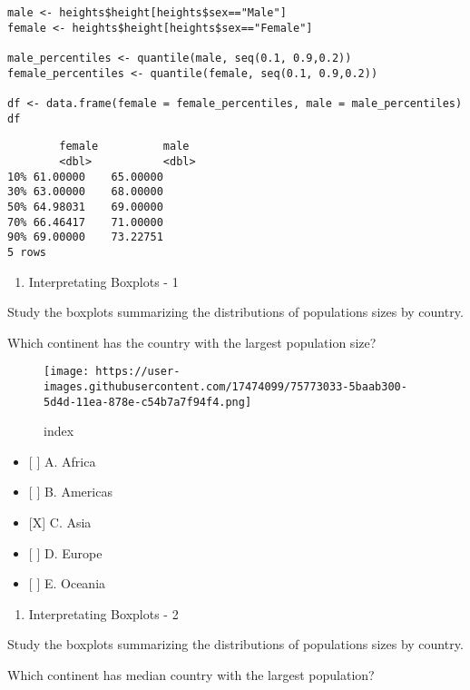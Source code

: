 \documentclass[]{article}
\providecommand{\tightlist}{%
  \setlength{\itemsep}{0pt}\setlength{\parskip}{0pt}}
\begin{document}
\begin{verbatim}
male <- heights$height[heights$sex=="Male"]
female <- heights$height[heights$sex=="Female"]

male_percentiles <- quantile(male, seq(0.1, 0.9,0.2))
female_percentiles <- quantile(female, seq(0.1, 0.9,0.2))

df <- data.frame(female = female_percentiles, male = male_percentiles)
df
\end{verbatim}

\begin{verbatim}
        female          male
        <dbl>           <dbl>
10% 61.00000    65.00000
30% 63.00000    68.00000
50% 64.98031    69.00000
70% 66.46417    71.00000
90% 69.00000    73.22751
5 rows
\end{verbatim}

\begin{enumerate}
\def\labelenumi{\arabic{enumi}.}
\setcounter{enumi}{2}
\tightlist
\item
  Interpretating Boxplots - 1
\end{enumerate}

Study the boxplots summarizing the distributions of populations sizes by
country.

Which continent has the country with the largest population size?

\begin{figure}
\centering
\texttt{[image: https://user-images.githubusercontent.com/17474099/75773033-5baab300-5d4d-11ea-878e-c54b7a7f94f4.png]}
\caption{index}
\end{figure}

\begin{itemize}
\tightlist
\item
  {[} {]} A. Africa
\item
  {[} {]} B. Americas
\item
  {[}X{]} C. Asia
\item
  {[} {]} D. Europe
\item
  {[} {]} E. Oceania
\end{itemize}

\begin{enumerate}
\def\labelenumi{\arabic{enumi}.}
\setcounter{enumi}{3}
\tightlist
\item
  Interpretating Boxplots - 2
\end{enumerate}

Study the boxplots summarizing the distributions of populations sizes by
country.

Which continent has median country with the largest population?
\end{document}
